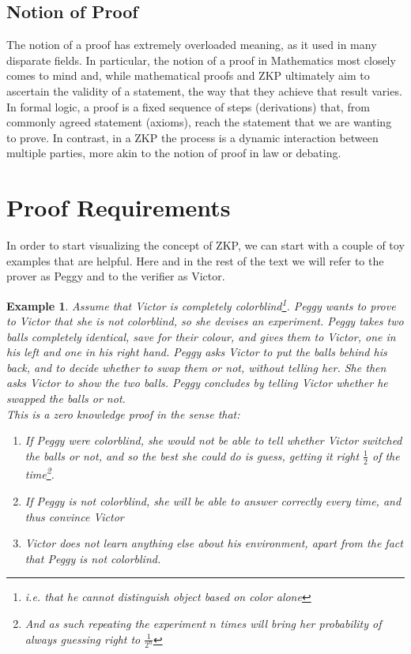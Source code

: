 \documentclass{article}
\newtheorem{example}{Example}
\begin{document}
\subsection{Notion of Proof}
The notion of a proof has extremely overloaded meaning, as it used in many disparate fields. In particular, the notion of a proof in Mathematics most closely comes to mind and, while mathematical proofs and ZKP ultimately aim to ascertain the validity of a statement, the way that they achieve that result varies. In formal logic, a proof is a fixed sequence of steps (derivations) that, from commonly agreed statement (axioms), reach the statement that we are wanting to prove. In contrast, in a ZKP the process is a dynamic interaction between multiple parties, more akin to the notion of proof in law or debating.

\section{Proof Requirements}
\label{proofreq}
In order to start visualizing the concept of ZKP, we can start with a couple of toy examples that are helpful. Here and in the rest of the text we will refer to the prover as Peggy and to the verifier as Victor.
\begin{example}
    Assume that Victor is completely colorblind\footnote{i.e. that he cannot distinguish object based on color alone}.
    Peggy wants to prove to Victor that she is not colorblind, so she devises an experiment.
    Peggy takes two balls completely identical, save for their colour, and gives them to Victor, one in his left and one in his right hand.
    Peggy asks Victor to put the balls behind his back, and to decide whether to swap them or not, without telling her.
    She then asks Victor to show the two balls.
    Peggy concludes by telling Victor whether he swapped the balls or not.\\
    This is a zero knowledge proof in the sense that:
    \begin{enumerate}
        \item If Peggy were colorblind, she would not be able to tell whether Victor switched the balls or not, and so the best she could do is guess, getting it right $\frac{1}{2}$ of the time\footnote{And as such repeating the experiment $n$ times will bring her probability of always guessing right to $\frac{1}{2^n}$}.
        \item If Peggy is not colorblind, she will be able to answer correctly every time, and thus convince Victor
        \item Victor does not learn anything else about his environment, apart from the fact that Peggy is not colorblind.
    \end{enumerate}
\end{example}
\end{document}
